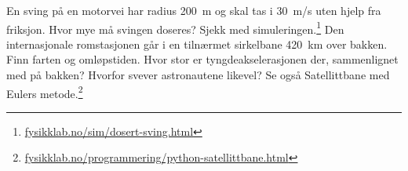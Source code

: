 \documentclass[11pt]{article}
\begin{document}
\begin{oppgaveliste}
\svar
\oppgave {}En sving på en motorvei har radius 200~m og skal tas i 30~m/s uten hjelp fra friksjon. Hvor mye må svingen doseres? Sjekk med simuleringen.\footnote{\url{fysikklab.no/sim/dosert-sving.html}}
\svar
\oppgave {}Den internasjonale romstasjonen går i en tilnærmet sirkelbane 420~km over bakken. Finn farten og omløpstiden. Hvor stor er tyngdeakselerasjonen der, sammenlignet med på bakken? Hvorfor svever astronautene likevel? Se også Satellittbane med Eulers metode.\footnote{\url{fysikklab.no/programmering/python-satellittbane.html}}
\svar
\end{oppgaveliste}
\end{document}
